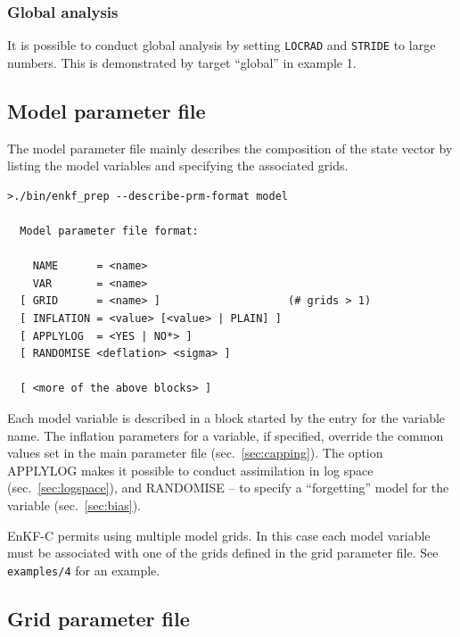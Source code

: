 \documentclass[11pt]{report}
\begin{document}
\subsubsection{Global analysis}

It is possible to conduct global analysis by setting \verb|LOCRAD| and \verb|STRIDE| to large numbers.
This is demonstrated by target ``global'' in example 1.

\subsection{Model parameter file}
\label{sec:modelprm}

The model parameter file mainly describes the composition of the state vector by listing the model variables and specifying the associated grids.

\begin{Verbatim}[frame=single,fontsize=\footnotesize]
>./bin/enkf_prep --describe-prm-format model

  Model parameter file format:

    NAME      = <name>
    VAR       = <name>
  [ GRID      = <name> ]                    (# grids > 1)
  [ INFLATION = <value> [<value> | PLAIN] ]
  [ APPLYLOG  = <YES | NO*> ]
  [ RANDOMISE <deflation> <sigma> ]

  [ <more of the above blocks> ]
\end{Verbatim}

Each model variable is described in a block started by the entry for the variable name.
The inflation parameters for a variable, if specified, override the common values set in the main parameter file (sec.~\ref{sec:capping}).
The option APPLYLOG makes it possible to conduct assimilation in log space (sec.~\ref{sec:logspace}), and RANDOMISE -- to specify a ``forgetting'' model for the variable (sec.~\ref{sec:bias}).

EnKF-C permits using multiple model grids.
In this case each model variable must be associated with one of the grids defined in the grid parameter file.
See \verb|examples/4| for an example.

\subsection{Grid parameter file}
\label{sec:gridprm}
\end{document}
